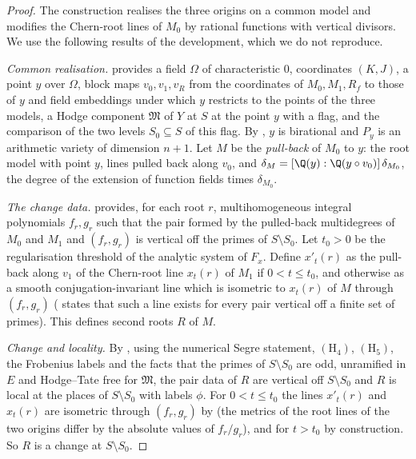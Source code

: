 \begin{proof}
The construction realises the three origins on a common model and modifies the Chern-root lines of $M_0$ by
rational functions with vertical divisors. We use the following results of the development, which we do not
reproduce.

\emph{Common realisation.}  provides a field $\Omega$ of
characteristic $0$, coordinates $(K,J)$, a point $y$ over $\Omega$, block maps $v_0,v_1,v_R$ from the coordinates of
$M_0,M_1,R_f$ to those of $y$ and field embeddings under which $y$ restricts to the points of the three models, a Hodge
component $\mathfrak M$ of $Y$ at $S$ at the point $y$ with a flag, and the comparison of the two levels $S_0\subseteq
S$ of this flag. By , $y$ is birational and $P_y$ is an
arithmetic variety of dimension $n+1$. Let $M$ be the \emph{pull-back} of $M_0$ to $y$: the root model with point $y$,
lines pulled back along $v_0$, and $\delta_M=[\Q(y):\Q(y\circ v_0)]\,\delta_{M_0}$, the degree of the extension of
function fields times $\delta_{M_0}$.

\emph{The change data.}  provides, for each root $r$,
multihomogeneous integral polynomials $f_r,g_r$ such that the pair formed by the pulled-back multidegrees of $M_0$ and
$M_1$ and $(f_r,g_r)$ is vertical off the primes of $S\setminus S_0$. Let $t_0>0$ be the regularisation threshold of
the analytic system of $F_x$. Define $x'_t(r)$ as the pull-back along $v_1$ of the Chern-root line $x_t(r)$ of $M_1$
if $0<t\le t_0$, and otherwise as a smooth conjugation-invariant line which is isometric to $x_t(r)$ of $M$ through
$(f_r,g_r)$ ( states that such a line exists for every pair
vertical off a finite set of primes). This defines second roots $R$ of $M$.

\emph{Change and locality.} By , using the numerical Segre
statement, $(\mathrm{H}_4)$, $(\mathrm{H}_5)$, the Frobenius labels and the facts that the primes of $S\setminus S_0$
are odd, unramified in $E$ and Hodge--Tate free for $\mathfrak M$, the pair data of $R$ are vertical off
$S\setminus S_0$ and $R$ is local at the places of $S\setminus S_0$ with labels $\phi$. For $0<t\le t_0$ the lines
$x'_t(r)$ and $x_t(r)$ are isometric through $(f_r,g_r)$ by 
(the metrics of the root lines of the two origins differ by the absolute values of $f_r/g_r$), and for $t>t_0$ by
construction. So $R$ is a change at $S\setminus S_0$.


\end{proof}
